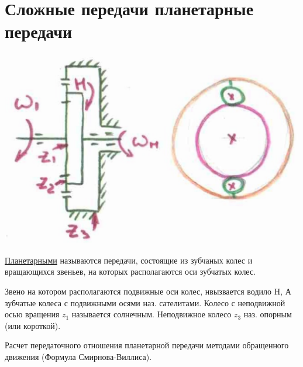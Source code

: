 \documentclass{article}
\begin{document}
\section{Сложные передачи планетарные передачи}

\includegraphics[width = \textwidth]{1}

\underline{Планетарными} называются передачи, состоящие из зубчаных колес и вращающихся звеньев, на которых располагаются оси зубчатых колес.

Звено на котором располагаются подвижные оси колес, нвызвается водило H, А зубчатые колеса с подвижными осями наз. сателитами. Колесо с неподвижной осью вращения $z_1$ называется солнечным. Неподвижное колесо $z_3$ наз. опорным (или короткой).

Расчет передаточного отношения планетарной передачи методами обращенного движения (Формула Смирнова-Виллиса).
\end{document}

